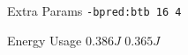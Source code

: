 
        \begin{tcolorbox}[width=\linewidth, colback=white!95!black, colframe=white!95!black]
            
            
            Extra Params \hfill \verb|-bpred:btb 16 4|

            Energy Usage \hfill \st{$0.386J$} $0.365J$

        \end{tcolorbox}
    